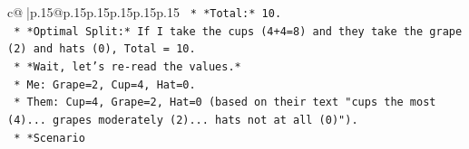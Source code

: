 \documentclass{article}
\begin{document}
{\begin{supertabular}{c@{$\;$}|p{.15\linewidth}@{}p{.15\linewidth}p{.15\linewidth}p{.15\linewidth}p{.15\linewidth}p{.15\linewidth}}
{{{\texttt{    *   *Total:* 10.} \\
\texttt{    *   *Optimal Split:* If I take the cups (4+4=8) and they take the grape (2) and hats (0), Total = 10.} \\
\texttt{    *   *Wait, let's re{-}read the values.*} \\
\texttt{        *   Me: Grape=2, Cup=4, Hat=0.} \\
\texttt{        *   Them: Cup=4, Grape=2, Hat=0 (based on their text "cups the most (4)... grapes moderately (2)... hats not at all (0)").} \\
\texttt{    *   *Scenario} \\
            }
        }
    }
     \\ \\

\end{supertabular}
}
\end{document}
